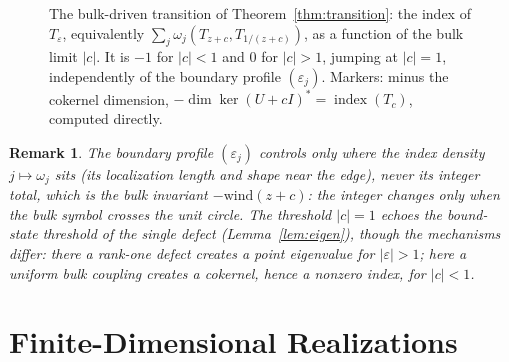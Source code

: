 \documentclass[10pt]{amsart}
\newcommand{\1}{{\mathbb{I}}}
\newcommand{\ind}{\operatorname{index}}
\newtheorem{remark}[theorem]{Remark}
\numberwithin{equation}{section}
\begin{document}
\begin{figure}[htbp]
\centering
{}
\caption{The bulk-driven transition of Theorem~\ref{thm:transition}: the index of $T_\varepsilon$,
equivalently $\sum_j\omega_j(T_{z+c},T_{1/(z+c)})$, as a function of the bulk limit $|c|$. It is
$-1$ for $|c|<1$ and $0$ for $|c|>1$, jumping at $|c|=1$, independently of the boundary profile
$(\varepsilon_j)$. Markers: minus the cokernel dimension, $-\dim\ker(U+cI)^*=\ind(T_c)$, computed directly.}
\label{fig:transition}
\end{figure}

\begin{remark}
The boundary profile $(\varepsilon_j)$ controls only \emph{where} the index density
$j\mapsto\omega_j$ sits (its localization length and shape near the edge), never its integer
total, which is the bulk invariant $-\mathrm{wind}(z+c)$: the integer changes only when the bulk
symbol crosses the unit circle. The threshold $|c|=1$ echoes the bound-state threshold of the single
defect (Lemma~\ref{lem:eigen}), though the mechanisms differ: there a rank-one defect creates a
point eigenvalue for $|\varepsilon|>1$; here a uniform bulk coupling creates a cokernel, hence a
nonzero index, for $|c|<1$.
\end{remark}

\section{Finite-Dimensional Realizations}
\label{sec:extensions}
\end{document}
